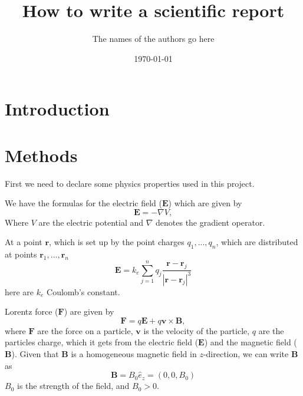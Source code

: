 \documentclass[english,notitlepage,reprint,nofootinbib]{revtex4-1}  %
\begin{document}
	
	\title{How to write a scientific report}  %
	\author{The names of the authors go here} %
	\date{\today}                             %
	\noaffiliation                            %
	
	\begin{abstract}
	\end{abstract}
	\maketitle
	
	
	\section{Introduction}
	
	
	\section{Methods}\label{sec:methods}

	First we need to declare some physics properties used in this project.

	We have the formulas for the electric field ($\mathbf{E}$) which are given by
	\begin{equation} \label{eq:electric field}
		\mathbf{E} = -\nabla V,
	\end{equation}
	Where $V$ are the electric potential and $\nabla$ denotes the gradient operator.
	
	At a point $\mathbf{r}$, which is set up by the point charges ${q_1, ..., q_n}$, which are distributed at points ${\mathbf{r}_1, ..., \mathbf{r}_n}$
	\begin{equation} \label{eq:electric field2}
		\mathbf{E} = k_e \sum_{j=1}^n q_j \frac{\mathbf{r}-\mathbf{r}_j}{|\mathbf{r}-\mathbf{r}_j|^3}
	\end{equation}
	here are $k_e$ Coulomb’s constant.

	Lorentz force ($\mathbf{F}$) are given by
	\begin{equation} \label{eq:Lorentz force}
		\mathbf{F} = q\mathbf{E} + q\mathbf{v}\times \mathbf{B},
	\end{equation}
	where $\mathbf{F}$ are the force on a particle, $\mathbf{v}$ is the velocity of the particle, $q$ are the particles charge, which it gets from the electric field ($\mathbf{E}$) and the magnetic field ($\mathbf{B}$). Given that $\mathbf{B}$ is a homogeneous magnetic field in $z$-direction, we can write $\mathbf{B}$ as
	\begin{equation} \label{eq:Bfield}
		\mathbf{B} = B_0\hat{e}_z = (0, 0, B_0)
	\end{equation}
	$B_0$ is the strength of the field, and $B_0 > 0$.
\end{document}
